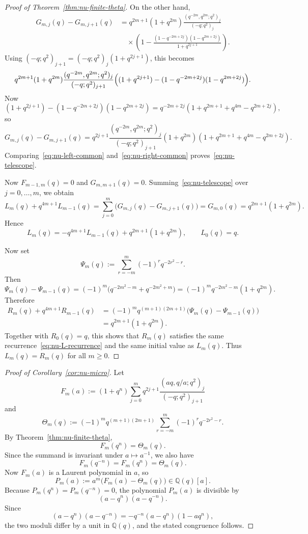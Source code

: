 \documentclass[reqno]{amsart}
\theoremstyle{definition}
\theoremstyle{plain}
\theoremstyle{remark}
\newcommand{\Q}{\mathbb{Q}}
\numberwithin{equation}{section}
\begin{document}
\begin{proof}[Proof of Theorem~\ref{thm:nu-finite-theta}]
On the other hand,
\begin{align*}
G_{m,j}(q)-G_{m,j+1}(q)
&=
q^{2m+1}(1+q^{2m})
\frac{(q^{-2m},q^{2m};q^2)_j}{(-q;q^2)_j}\\
&\quad\times
\left(
1-\frac{(1-q^{-2m+2j})(1-q^{2m+2j})}{1+q^{2j+1}}
\right).
\end{align*}
Using $(-q;q^2)_{j+1}=(-q;q^2)_j(1+q^{2j+1})$, this becomes
\[
q^{2m+1}(1+q^{2m})
\frac{(q^{-2m},q^{2m};q^2)_j}{(-q;q^2)_{j+1}}
\Bigl((1+q^{2j+1})-(1-q^{-2m+2j})(1-q^{2m+2j})\Bigr).
\]
Now
\[
(1+q^{2j+1})-(1-q^{-2m+2j})(1-q^{2m+2j})
=
q^{-2m+2j}(1+q^{2m+1}+q^{4m}-q^{2m+2j}),
\]
so
\begin{equation}\label{eq:nu-right-common}
G_{m,j}(q)-G_{m,j+1}(q)
=
q^{2j+1}\frac{(q^{-2m},q^{2m};q^2)_j}{(-q;q^2)_{j+1}}
(1+q^{2m})(1+q^{2m+1}+q^{4m}-q^{2m+2j}).
\end{equation}
Comparing~\eqref{eq:nu-left-common} and~\eqref{eq:nu-right-common} proves~\eqref{eq:nu-telescope}.

Now $F_{m-1,m}(q)=0$ and $G_{m,m+1}(q)=0$. Summing~\eqref{eq:nu-telescope} over $j=0,\dots,m$, we obtain
\[
L_m(q)+q^{4m+1}L_{m-1}(q)
=
\sum_{j=0}^{m}\bigl(G_{m,j}(q)-G_{m,j+1}(q)\bigr)
=
G_{m,0}(q)
=
q^{2m+1}(1+q^{2m}).
\]
Hence
\begin{equation}\label{eq:nu-L-recurrence}
L_m(q)=-q^{4m+1}L_{m-1}(q)+q^{2m+1}(1+q^{2m}),
\qquad
L_0(q)=q.
\end{equation}

Now set
\[
\Psi_m(q):=\sum_{r=-m}^{m}(-1)^r q^{-2r^2-r}.
\]
Then
\[
\Psi_m(q)-\Psi_{m-1}(q)
=
(-1)^m\bigl(q^{-2m^2-m}+q^{-2m^2+m}\bigr)
=
(-1)^m q^{-2m^2-m}(1+q^{2m}).
\]
Therefore
\begin{align*}
R_m(q)+q^{4m+1}R_{m-1}(q)
&=
(-1)^m q^{(m+1)(2m+1)}\bigl(\Psi_m(q)-\Psi_{m-1}(q)\bigr)\\
&=
q^{2m+1}(1+q^{2m}).
\end{align*}
Together with $R_0(q)=q$, this shows that $R_m(q)$ satisfies the same recurrence~\eqref{eq:nu-L-recurrence} and the same initial value as $L_m(q)$. Thus $L_m(q)=R_m(q)$ for all $m\ge 0$.
\end{proof}

\begin{proof}[Proof of Corollary~\ref{cor:nu-micro}]
Let
\[
F_m(a):=(1+q^n)\sum_{j=0}^{m} q^{2j+1}\frac{(aq,q/a;q^2)_j}{(-q;q^2)_{j+1}}
\]
and
\[
\Theta_m(q):=
(-1)^m q^{(m+1)(2m+1)}
\sum_{r=-m}^{m} (-1)^r q^{-2r^2-r}.
\]
By Theorem~\ref{thm:nu-finite-theta},
\[
F_m(q^n)=\Theta_m(q).
\]
Since the summand is invariant under $a\mapsto a^{-1}$, we also have
\[
F_m(q^{-n})=F_m(q^n)=\Theta_m(q).
\]
Now $F_m(a)$ is a Laurent polynomial in $a$, so
\[
P_m(a):=a^m\bigl(F_m(a)-\Theta_m(q)\bigr)\in \Q(q)[a].
\]
Because $P_m(q^n)=P_m(q^{-n})=0$, the polynomial $P_m(a)$ is divisible by
\[
(a-q^n)(a-q^{-n}).
\]
Since
\[
(a-q^n)(a-q^{-n})=-q^{-n}(a-q^n)(1-aq^n),
\]
the two moduli differ by a unit in $\Q(q)$, and the stated congruence follows.
\end{proof}
\end{document}
